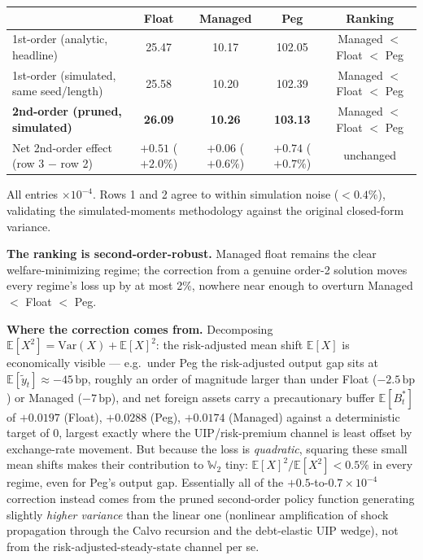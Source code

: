 \documentclass[12pt]{article}
\begin{document}
\begin{center}
\begin{tabular}{lcccc}
\toprule
 & \textbf{Float} & \textbf{Managed} & \textbf{Peg} & Ranking \\
\midrule
1st-order (analytic, headline) & 25.47 & 10.17 & 102.05 & Managed $<$ Float $<$ Peg \\
1st-order (simulated, same seed/length) & 25.58 & 10.20 & 102.39 & Managed $<$ Float $<$ Peg \\
\textbf{2nd-order (pruned, simulated)} & \textbf{26.09} & \textbf{10.26} & \textbf{103.13} & Managed $<$ Float $<$ Peg \\
\midrule
Net 2nd-order effect (row 3 $-$ row 2) & $+0.51$ ($+2.0\%$) & $+0.06$ ($+0.6\%$) & $+0.74$ ($+0.7\%$) & unchanged \\
\bottomrule
\end{tabular}
\end{center}
{\footnotesize All entries $\times10^{-4}$. Rows 1 and 2 agree to within simulation noise ($<0.4\%$), validating the simulated-moments methodology against the original closed-form variance.}

\textbf{The ranking is second-order-robust.} Managed float remains the clear welfare-minimizing regime; the correction from a genuine order-2 solution moves every regime's loss up by at most 2\%, nowhere near enough to overturn Managed $<$ Float $<$ Peg.

\textbf{Where the correction comes from.} Decomposing $\mathbb{E}[X^2]=\mathrm{Var}(X)+\mathbb{E}[X]^2$: the risk-adjusted mean shift $\mathbb{E}[X]$ is economically visible --- e.g.\ under Peg the risk-adjusted output gap sits at $\mathbb{E}[\tilde y_t]\approx-45\,\mathrm{bp}$, roughly an order of magnitude larger than under Float ($-2.5\,\mathrm{bp}$) or Managed ($-7\,\mathrm{bp}$), and net foreign assets carry a precautionary buffer $\mathbb{E}[B^*_t]$ of $+0.0197$ (Float), $+0.0288$ (Peg), $+0.0174$ (Managed) against a deterministic target of $0$, largest exactly where the UIP/risk-premium channel is least offset by exchange-rate movement. But because the loss is \emph{quadratic}, squaring these small mean shifts makes their contribution to $\mathbb{W}_2$ tiny: $\mathbb{E}[X]^2/\mathbb{E}[X^2]<0.5\%$ in every regime, even for Peg's output gap. Essentially all of the $+0.5$-to-$0.7\times10^{-4}$ correction instead comes from the pruned second-order policy function generating slightly \emph{higher variance} than the linear one (nonlinear amplification of shock propagation through the Calvo recursion and the debt-elastic UIP wedge), not from the risk-adjusted-steady-state channel per se.
\end{document}
